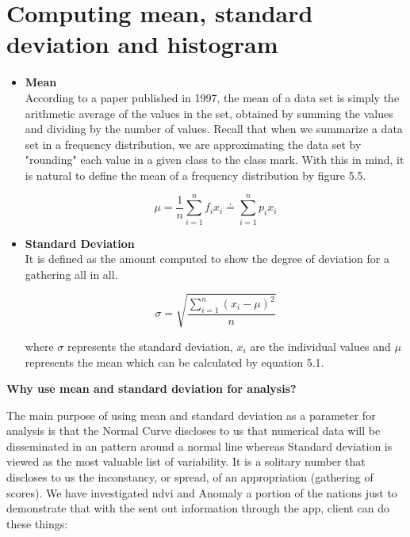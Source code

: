 \newpage

\section{Computing mean, standard deviation and histogram}

\begin{itemize}
    \item \textbf{Mean} \\
    According to a paper published in 1997, the mean of a data set is simply the arithmetic average of the values in the set, obtained by summing the values and dividing by the number of values. Recall that when we summarize a data set in a frequency distribution, we are approximating the data set by "rounding" each value in a given class to the class mark. With this in mind, it is natural to define the mean of a frequency distribution by figure 5.5. \cite{Mean_SD}
    
    \begin{equation} \label{eq:mean_formula}
       \mu = \frac{1}{n} \sum\limits_{i=1}^{n}f_{i}x_{i} \doteq \sum\limits_{i=1}^{n}p_{i}x_{i}
    \end{equation}
    
    \item \textbf{Standard Deviation} \\
   It is defined as the amount computed to show the degree of deviation for a gathering all in all.
   
  \begin{equation} \label{eq:standarddeviation_formula}
      \sigma = \sqrt{\frac{\sum\limits_{i=1}^{n}(x_{i} - \mu)^2}{n}}
    \end{equation}
    

where $\sigma$ represents the standard deviation, $x_{i}$ are the individual values and $\mu$ represents the mean which can be calculated by equation 5.1.
    
\end{itemize}

\centerline{\textbf{Why use mean and standard deviation for analysis?}}

The main purpose of using mean and standard deviation as a parameter for analysis is that the Normal Curve discloses to us that numerical data will be disseminated in an pattern around a normal line whereas Standard deviation is viewed as the most valuable list of variability. It is a solitary number that discloses to us the inconstancy, or spread, of an appropriation (gathering of scores). We have investigated \gls{ndvi} and Anomaly a portion of the nations just to demonstrate that with the sent out information through the app, client can do these things:

